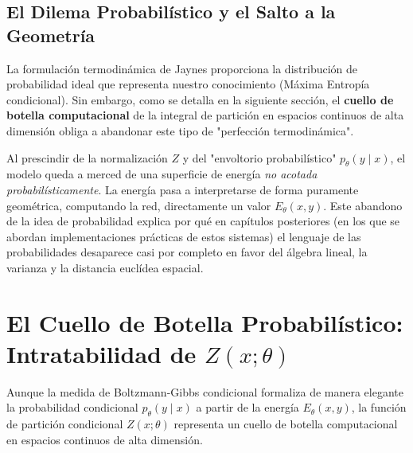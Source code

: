 \subsection{El Dilema Probabilístico y el Salto a la Geometría}
La formulación termodinámica de Jaynes proporciona la distribución de probabilidad ideal que representa nuestro conocimiento (Máxima Entropía condicional). Sin embargo, como se detalla en la siguiente sección, el \textbf{cuello de botella computacional} de la integral de partición en espacios continuos de alta dimensión obliga a abandonar este tipo de "perfección termodinámica". 

Al prescindir de la normalización $Z$ y del "envoltorio probabilístico" $p_\theta(y \mid x)$, el modelo queda a merced de una superficie de energía \textit{no acotada probabilísticamente}. La energía pasa a interpretarse de forma puramente geométrica, computando la red, directamente un valor $E_\theta(x, y)$. Este abandono de la idea de probabilidad explica por qué en capítulos posteriores (en los que se abordan implementaciones prácticas de estos sistemas) el lenguaje de las probabilidades desaparece casi por completo en favor del álgebra lineal, la varianza y la distancia euclídea espacial.




\section{El Cuello de Botella Probabilístico: Intratabilidad de $Z(x; \theta)$}
\label{sec:cuello_botella}

Aunque la medida de Boltzmann-Gibbs condicional formaliza de manera elegante la probabilidad condicional $p_\theta(y \mid x)$ a partir de la energía $E_\theta(x, y)$, la función de partición condicional $Z(x; \theta)$ representa un cuello de botella computacional en espacios continuos de alta dimensión.

